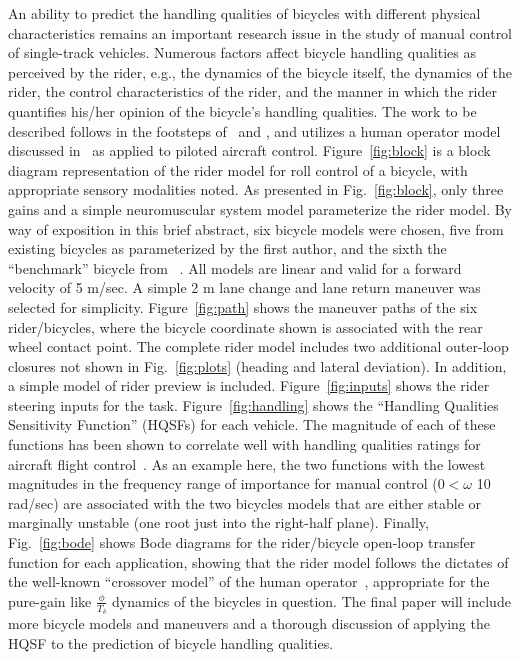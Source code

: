 \documentclass{bmd2010a}
\begin{document}
An ability to predict the handling qualities of bicycles with different
physical characteristics remains an important research issue in the study of
manual control of single-track vehicles. Numerous factors affect bicycle
handling qualities as perceived by the rider, e.g., the dynamics of the bicycle
itself, the dynamics of the rider, the control characteristics of the rider,
and the manner in which the rider quantifies his/her opinion of the bicycle's
handling qualities. The work to be described follows in the footsteps
of~\cite{Lunteren1970} and \cite{Weir1972}, and utilizes a human operator model
discussed in~\cite{Hess2006} as applied to
piloted aircraft control. Figure~\ref{fig:block} is a block diagram representation of the
rider model for roll control of a bicycle, with appropriate sensory modalities
noted. As presented in Fig.~\ref{fig:block}, only three gains and a simple neuromuscular
system model parameterize the rider model. By way of exposition in this brief
abstract, six bicycle models were chosen, five from existing bicycles as
parameterized by the first author, and the sixth the ``benchmark'' bicycle from
~\cite{Meijaard2007}. All models are linear and valid for a forward velocity of 5 m/sec. A
simple 2 m lane change and lane return maneuver was selected for simplicity.
Figure~\ref{fig:path} shows the maneuver paths of the six rider/bicycles, where the bicycle
coordinate shown is associated with the rear wheel contact point. The complete
rider model includes two additional outer-loop closures not shown in
Fig.~\ref{fig:plots} (heading and lateral deviation). In addition, a simple model of rider preview
is included. Figure~\ref{fig:inputs} shows the rider steering inputs for the
task. Figure~\ref{fig:handling} shows the ``Handling Qualities Sensitivity
Function'' (HQSFs) for each vehicle.
The magnitude of each of these functions has been shown to correlate well with
handling qualities ratings for aircraft flight control~\cite{Hess2006}. As an example here,
the two functions with the lowest magnitudes in the frequency range of
importance for manual control ($0<\omega$  10 rad/sec) are associated with the two
bicycles models that are either stable or marginally unstable (one root just
into the right-half plane). Finally, Fig.~\ref{fig:bode} shows Bode diagrams for the
rider/bicycle open-loop transfer function for each application, showing that
the rider model follows the dictates of the well-known ``crossover model'' of the
human operator~\cite{McRuer1974}, appropriate for the pure-gain like
$\frac{\phi}{T_\delta}$ dynamics of the
bicycles in question. The final paper will include more bicycle models and
maneuvers and a thorough discussion of applying the HQSF to the prediction of
bicycle handling qualities.


\end{document}
